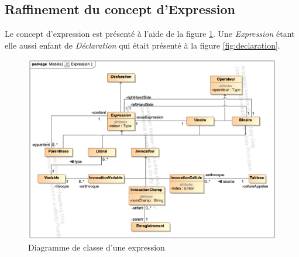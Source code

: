 
\subsection{Raffinement du concept d'Expression}
\label{sec:question9}

Le concept d'expression est présenté à l'aide de la figure \ref{fig:expression}. Une \emph{Expression} étant elle aussi enfant de \emph{Déclaration} qui était présenté à la figure \ref{fig:declaration}.

\begin{figure}
	\centering
	\includegraphics[width=500pt]{assets/class__Expression}
	\caption{Diagramme de classe d'une expression}
	\label{fig:expression}
\end{figure}

